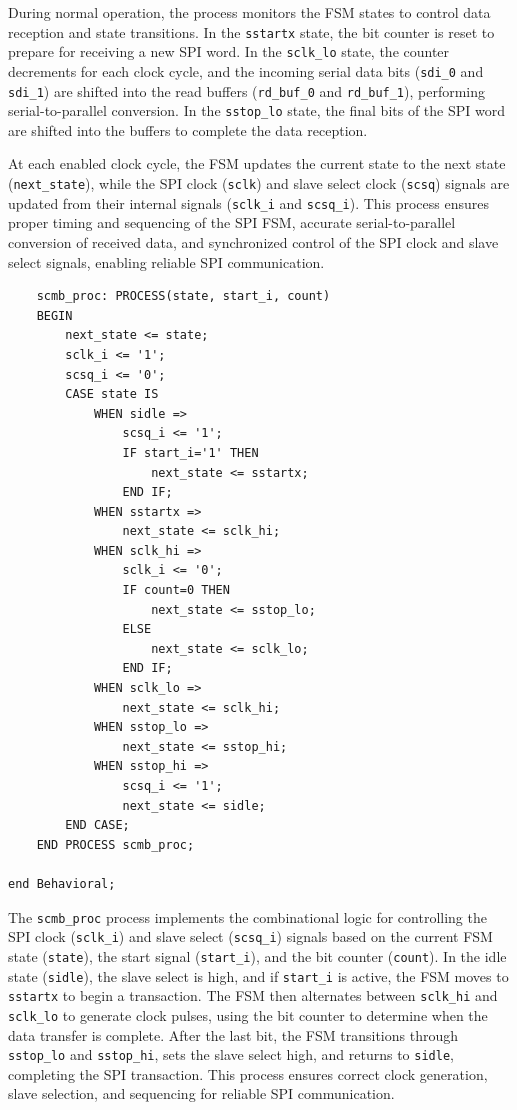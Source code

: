 During normal operation, the process monitors the FSM states to control data reception and state transitions. In the \texttt{sstartx} state, the bit counter is reset to prepare for receiving a new SPI word. In the \texttt{sclk\_lo} state, the counter decrements for each clock cycle, and the incoming serial data bits (\texttt{sdi\_0} and \texttt{sdi\_1}) are shifted into the read buffers (\texttt{rd\_buf\_0} and \texttt{rd\_buf\_1}), performing serial-to-parallel conversion. In the \texttt{sstop\_lo} state, the final bits of the SPI word are shifted into the buffers to complete the data reception.

At each enabled clock cycle, the FSM updates the current state to the next state (\texttt{next\_state}), while the SPI clock (\texttt{sclk}) and slave select clock (\texttt{scsq}) signals are updated from their internal signals (\texttt{sclk\_i} and \texttt{scsq\_i}). This process ensures proper timing and sequencing of the SPI FSM, accurate serial-to-parallel conversion of received data, and synchronized control of the SPI clock and slave select signals, enabling reliable SPI communication.


\begin{verbatim}
	scmb_proc: PROCESS(state, start_i, count)
	BEGIN
		next_state <= state;
		sclk_i <= '1';
		scsq_i <= '0';
		CASE state IS
			WHEN sidle =>
				scsq_i <= '1';
				IF start_i='1' THEN
					next_state <= sstartx;
				END IF;
			WHEN sstartx =>
                next_state <= sclk_hi;
			WHEN sclk_hi =>
                sclk_i <= '0';
                IF count=0 THEN
                    next_state <= sstop_lo;
                ELSE
                    next_state <= sclk_lo;
                END IF;
            WHEN sclk_lo =>
				next_state <= sclk_hi;
			WHEN sstop_lo =>
				next_state <= sstop_hi;
			WHEN sstop_hi =>
				scsq_i <= '1';
				next_state <= sidle;
		END CASE;
	END PROCESS scmb_proc;

end Behavioral;
\end{verbatim}

The \texttt{scmb\_proc} process implements the combinational logic for controlling the SPI clock (\texttt{sclk\_i}) and slave select (\texttt{scsq\_i}) signals based on the current FSM state (\texttt{state}), the start signal (\texttt{start\_i}), and the bit counter (\texttt{count}). In the idle state (\texttt{sidle}), the slave select is high, and if \texttt{start\_i} is active, the FSM moves to \texttt{sstartx} to begin a transaction. The FSM then alternates between \texttt{sclk\_hi} and \texttt{sclk\_lo} to generate clock pulses, using the bit counter to determine when the data transfer is complete. After the last bit, the FSM transitions through \texttt{sstop\_lo} and \texttt{sstop\_hi}, sets the slave select high, and returns to \texttt{sidle}, completing the SPI transaction. This process ensures correct clock generation, slave selection, and sequencing for reliable SPI communication.\\

